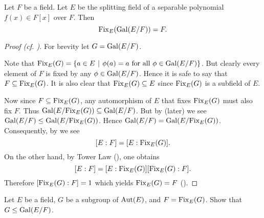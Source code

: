 \begin{proposition}\label{prop-fixed-field-of-Gal-E/F-is-F}
    Let $F$ be a field. Let $E$ be the splitting field of a separable polynomial $f(x) \in F[x]$ over $F$. Then
    \[
        \mathrm{Fix}_{E}(\mathrm{Gal}(E/F)) = F.
    \]
\end{proposition}
\begin{proof}[Proof (cf. {\cite[Proposition 23.17]{judson_beezer_2022}})]
    For brevity let $G = \mathrm{Gal}(E/F)$.

    Note that $\Fix{E}{G} = \{a \in E \vert \phi(a) = a \text{ for all } \phi \in \Gal{E/F}\}$. But clearly every element of $F$ is fixed by any $\phi \in \mathrm{Gal}(E/F)$. Hence it is safe to say that $F \subseteq \mathrm{Fix}_{E}(G)$. It is also clear that $\mathrm{Fix}_{E}(G) \subseteq E$ since $\mathrm{Fix}_{E}(G)$ is a subfield of $E$.

    Now since $F \subseteq \mathrm{Fix}_{E}(G)$, any automorphism of $E$ that fixes $\mathrm{Fix}_{E}(G)$ must also fix $F$. Thus $\mathrm{Gal}(E/\mathrm{Fix}_{E}(G)) \subseteq \mathrm{Gal}(E/F)$. But by  (later) we see $\mathrm{Gal}(E/F) \leq \mathrm{Gal}(E/\mathrm{Fix}_{E}(G))$. Hence $\mathrm{Gal}(E/F) = \mathrm{Gal}(E/\mathrm{Fix}_{E}(G))$. Consequently, by  we see
    \[
        [E:F] = [E:\mathrm{Fix}_{E}(G)].
    \]
    On the other hand, by Tower Law (), one obtains
    \[
        [E:F] = [E:\mathrm{Fix}_{E}(G)][\mathrm{Fix}_{E}(G):F].
    \]
    Therefore $[\mathrm{Fix}_{E}(G):F] = 1$ which yields $\mathrm{Fix}_{E}(G) = F$ ().
\end{proof}

\begin{exercise}\label{exercise-subgroup-of-Aut-E-is-subgroup-of-galois-group-of-fixed-field}
    Let $E$ be a field, $G$ be a subgroup of $\mathrm{Aut}(E)$, and $F = \mathrm{Fix}_{E}(G)$. Show that $G \leq \mathrm{Gal}(E/F)$.
\end{exercise}

